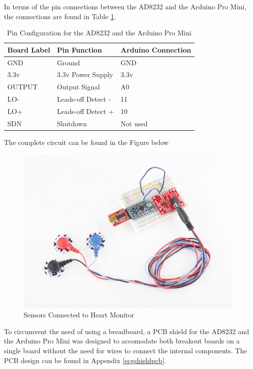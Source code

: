 In terms of the pin connections between the AD8232 and the Arduino Pro Mini, the connections are found in Table \ref{ad8232pinconfigurationtable}.

\begin{table}[H]
	\centering
	\caption{Pin Configuration for the AD8232 and the Arduino Pro Mini \cite{ad8232}}
	\label{ad8232pinconfigurationtable}
	\begin{tabular}{|l|l|l|}
		\hline
		\textbf{Board Label} & \textbf{Pin Function} & \textbf{Arduino Connection} \\ \hline
		GND                  & Ground                & GND                         \\ \hline
		3.3v                 & 3.3v Power Supply     & 3.3v                        \\ \hline
		OUTPUT               & Output Signal         & A0                          \\ \hline
		LO-                  & Leads-off Detect -    & 11                          \\ \hline
		LO+                  & Leads-off Detect +    & 10                          \\ \hline
		SDN                  & Shutdown              & Not used                    \\ \hline
	\end{tabular}
\end{table}


The complete circuit can be found in the Figure below 

\begin{figure}[H]
	\centering
	\includegraphics[width=0.6\linewidth]{ecgsetup.jpg}
	\caption{Sensors Connected to Heart Monitor \cite{ad8232}}
	\label{ecgsetup}
\end{figure}

To circumvent the need of using a breadboard, a PCB shield for the AD8232 and the Arduino Pro Mini was designed to accomodate both breakout boards on a single board without the need for wires to connect the internal components. The PCB design can be found in Appendix \ref{ecgshieldpcb}. 



